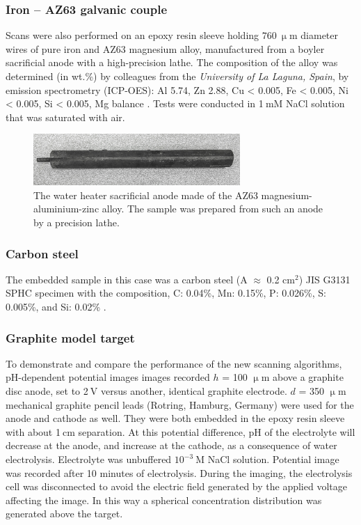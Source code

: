 			\subsubsection{Iron -- AZ63 galvanic couple}
Scans were also performed on an epoxy resin sleeve holding $760~\upmu$m diameter wires of pure iron and AZ63 magnesium alloy, manufactured from a boyler sacrificial anode with a high-precision lathe.
The composition of the alloy was determined (in wt.\%) by colleagues from the \emph{University of La Laguna, Spain}, by emission spectrometry (ICP-OES): Al 5.74, Zn 2.88, Cu < 0.005, Fe < 0.005, Ni < 0.005, Si < 0.005, Mg balance \cite{souto2013spatially}.
Tests were conducted in 1$~$mM NaCl solution that was saturated with air.

\begin{figure}
\centering
\includegraphics[width=0.7\textwidth]{img/az63.jpg}
\caption{The water heater sacrificial anode made of the AZ63 magnesium-aluminium-zinc alloy.
The sample was prepared from such an anode by a precision lathe.}
\label{fig:az63}
\end{figure}
			
			\subsubsection{Carbon steel}
The embedded sample in this case was a carbon steel (A $\approx$ 0.2 cm$^2$) JIS G3131 SPHC specimen with the composition, C: 0.04\%, Mn: 0.15\%, P: 0.026\%, S: 0.005\%, and Si: 0.02\% \cite{el2016secm}.

			\subsubsection{Graphite model target}
To demonstrate and compare the performance of the new scanning algorithms, pH-de\-pen\-dent potential images images recorded $h$ = 100 $\upmu$m above a graphite disc anode, set to 2$~$V versus another, identical graphite electrode.
$d$ = 350 $\upmu$m mechanical graphite pencil leads (Rotring, Hamburg, Germany) were used for the anode and cathode as well.
They were both embedded in the epoxy resin sleeve with about 1$~$cm separation.
At this potential difference, pH of the electrolyte will decrease at the anode, and increase at the cathode, as a consequence of water electrolysis.
Electrolyte was unbuffered $10^{-3}~$M NaCl solution.
Potential image was recorded after 10 minutes of electrolysis.
During the imaging, the electrolysis cell was disconnected to avoid the electric field generated by the applied voltage affecting the image.
In this way a spherical concentration distribution was generated above the target.

